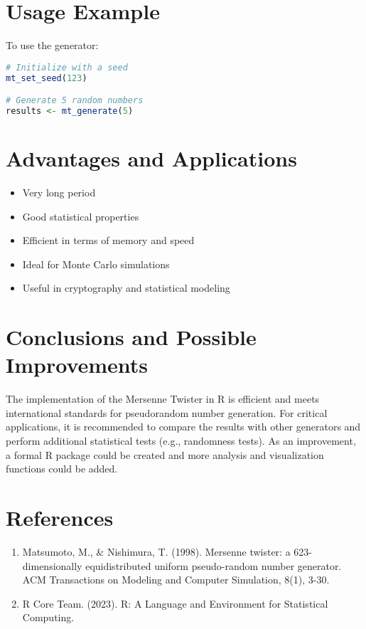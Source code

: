 \documentclass[12pt]{article}
\begin{document}
\section{Usage Example}
To use the generator:
\begin{lstlisting}[language=R]
# Initialize with a seed
mt_set_seed(123)

# Generate 5 random numbers
results <- mt_generate(5)
\end{lstlisting}

\section{Advantages and Applications}
\begin{itemize}
    \item Very long period
    \item Good statistical properties
    \item Efficient in terms of memory and speed
    \item Ideal for Monte Carlo simulations
    \item Useful in cryptography and statistical modeling
\end{itemize}

\section{Conclusions and Possible Improvements}
The implementation of the Mersenne Twister in R is efficient and meets international standards for pseudorandom number generation. For critical applications, it is recommended to compare the results with other generators and perform additional statistical tests (e.g., randomness tests). As an improvement, a formal R package could be created and more analysis and visualization functions could be added.

\section{References}
\begin{enumerate}
    \item Matsumoto, M., \& Nishimura, T. (1998). Mersenne twister: a 623-dimensionally equidistributed uniform pseudo-random number generator. ACM Transactions on Modeling and Computer Simulation, 8(1), 3-30.
    \item R Core Team. (2023). R: A Language and Environment for Statistical Computing.
\end{enumerate}
\end{document}
